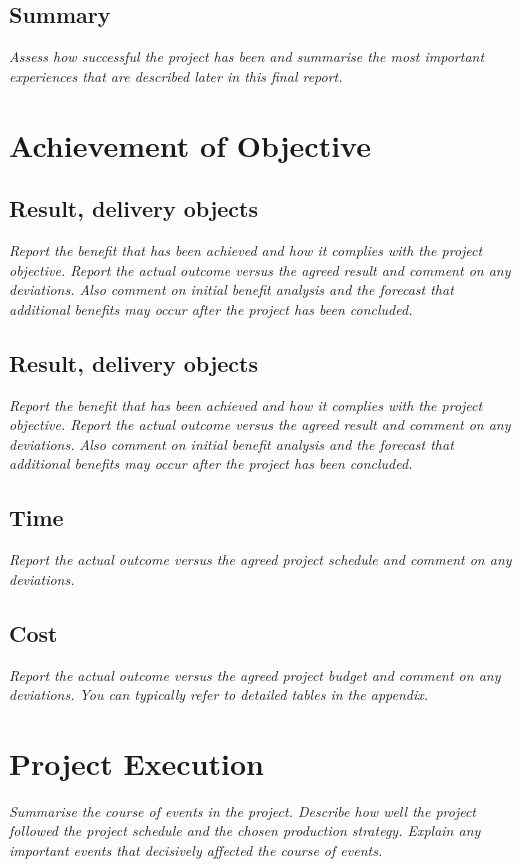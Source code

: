\documentclass{article}
\begin{document}
\subsection{Summary}
{\it Assess how successful the project has been and summarise the most important experiences that are described later in this final report.}

\section{Achievement of Objective}

\subsection{Result, delivery objects}

{\it Report the benefit that has been achieved and how it complies with the project objective. Report the actual outcome versus the agreed result and comment on any deviations. Also comment on initial benefit analysis and the forecast that additional benefits may occur after the project has been concluded.}

\subsection{Result, delivery objects}
{\it Report the benefit that has been achieved and how it complies with the project objective.
Report the actual outcome versus the agreed result and comment on any deviations. Also comment on initial benefit analysis and the forecast that additional benefits may occur after the project has been concluded.}

\subsection{Time}
{\it Report the actual outcome versus the agreed project schedule and comment on any deviations.}

\subsection{Cost}
{\it Report the actual outcome versus the agreed project budget and comment on any deviations. You can typically refer to detailed tables in the appendix.}
\section{Project Execution}
{\it Summarise the course of events in the project. Describe how well the project followed the project schedule and the chosen production strategy. Explain any important events that decisively affected the course of events.}
\end{document}
